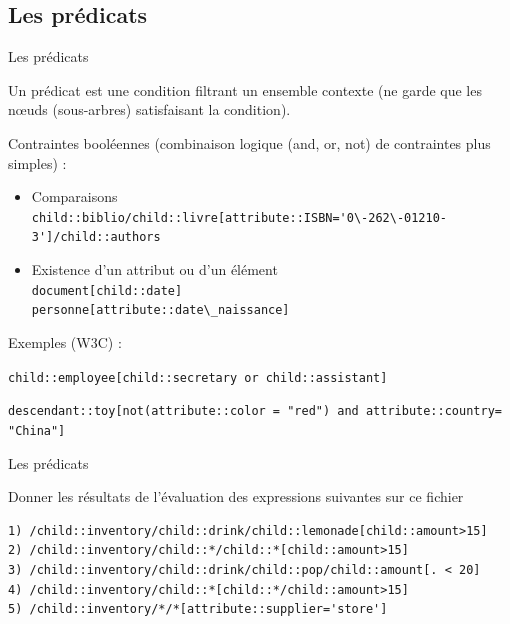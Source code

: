 \subsection{Les prédicats}

\begin{frame}{Les pr\'edicats}

Un pr\'edicat est une condition filtrant un ensemble contexte (ne garde que les n{\oe}uds (sous-arbres) satisfaisant la condition).\\

\medskip


Contraintes bool\'eennes (combinaison logique (and, or, not) de contraintes plus simples) :
\begin{itemize}
\item Comparaisons \\
	\verb?child::biblio/child::livre[attribute::ISBN='0\-262\-01210-3']/child::authors?
\item Existence d'un attribut ou d'un \'el\'ement \\
	\verb?document[child::date]?\\
	\verb?personne[attribute::date\_naissance]?
\end{itemize}


\bigskip

Exemples (W3C) :\\

\smallskip

\verb?child::employee[child::secretary or child::assistant]?\\

\smallskip

\verb?descendant::toy[not(attribute::color = "red") and attribute::country= "China"]?

\end{frame}


\begin{frame}{Les prédicats}

\vspace{-0.5cm}
     \begin{minipage}{0.7\textwidth}
        
      \end{minipage}

\vspace{-0.5cm}
\begin{exoblock}{Donner les résultats de l'évaluation des expressions suivantes sur ce fichier}
     \begin{footnotesize}
\begin{verbatim}
1) /child::inventory/child::drink/child::lemonade[child::amount>15]
2) /child::inventory/child::*/child::*[child::amount>15]
3) /child::inventory/child::drink/child::pop/child::amount[. < 20]
4) /child::inventory/child::*[child::*/child::amount>15]
5) /child::inventory/*/*[attribute::supplier='store']
\end{verbatim}
     \end{footnotesize}
      \end{exoblock}
\end{frame}

